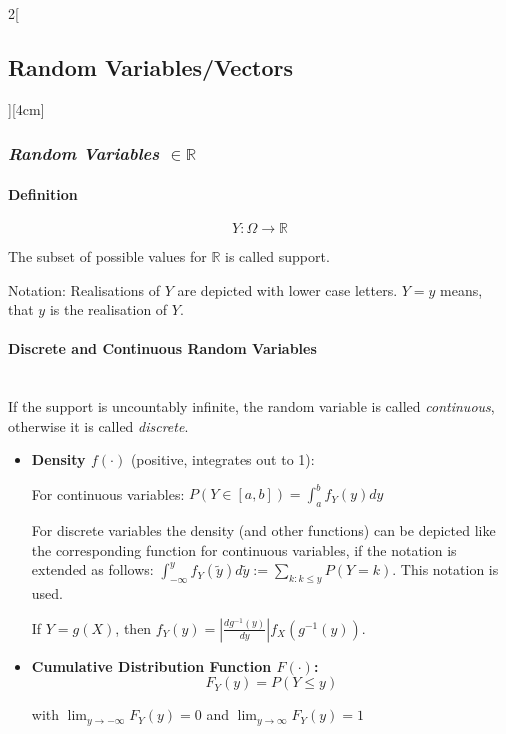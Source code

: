 \documentclass[8pt]{extarticle}
\begin{document}
\begin{multicols}{2}[\subsection{Random Variables/Vectors}][4cm]

\subsubsection*{\textit{Random Variables $\in \mathbb{R}$}}

\paragraph{Definition}

$$Y: \Omega \to \mathbb{R}$$

\noindent The subset of possible values for $\mathbb{R}$ is called support.

\noindent Notation: Realisations of $Y$ are depicted with lower case letters. $Y=y$ means, that $y$ is the realisation of $Y$.

\paragraph{Discrete and Continuous Random Variables} \ \\

\noindent If the support is uncountably infinite, the random variable is called \textit{continuous}, otherwise it is called \textit{discrete}.

\begin{itemize}
\item \textbf{Density \boldmath$f(\cdot)$} (positive, integrates out to 1): 

For continuous variables:
$P(Y \in \left[a, b\right]) = \int_{a}^{b} f_Y(y) dy$

For discrete variables the density (and other functions) can be depicted like the corresponding function for continuous variables, if the notation is extended as follows: 
$\int_{-\infty}^{y} f_Y(\tilde{y})d\tilde{y} := \sum_{k:k \leq y} P(Y=k)$. This notation is used.

If $Y = g(X)$, then $f_Y(y) = \left|\frac{d g^{-1}(y)}{d y}\right|f_X(g^{-1}(y))$.

\item \textbf{Cumulative Distribution Function \boldmath$F(\cdot)$:} 
$$F_Y(y) =P(Y\leq y)$$

with $\lim_{y\rightarrow-\infty}F_Y(y)=0$ and $\lim_{y\rightarrow\infty}F_Y(y)=1$
\end{itemize}


\end{multicols}
\end{document}
